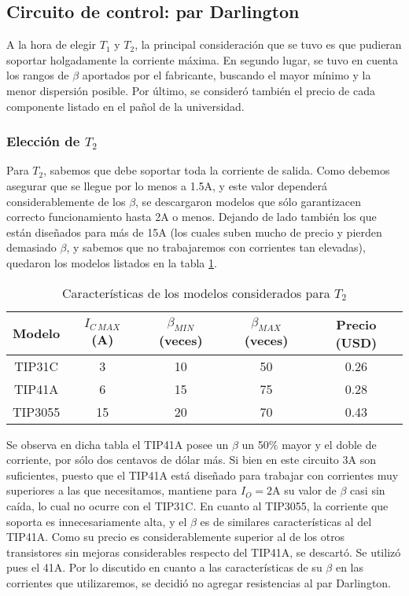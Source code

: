 \documentclass[e2_tp1_main.tex]{subfiles}
\begin{document}
\subsection{Circuito de control: par Darlington}

A la hora de elegir $T_1$ y $T_2$, la principal consideraci\'on que se tuvo es que pudieran soportar holgadamente la corriente m\'axima. En segundo lugar, se tuvo en cuenta los rangos de $\beta$ aportados por el fabricante, buscando el mayor m\'inimo y la menor dispersi\'on posible. Por \'ultimo, se consider\'o tambi\'en el precio de cada componente listado en el pa\~nol de la universidad.


\subsubsection{Elecci\'on de $T_2$}

Para $T_2$, sabemos que debe soportar toda la corriente de salida. Como debemos asegurar que se llegue por lo menos a 1.5A, y este valor depender\'a considerablemente de los $\beta$, se descargaron modelos que s\'olo garantizacen correcto funcionamiento hasta 2A o menos. Dejando de lado tambi\'en los que est\'an dise\~nados para m\'as de 15A (los cuales suben mucho de precio y pierden demasiado $\beta$, y sabemos que no trabajaremos con corrientes tan elevadas), quedaron los modelos listados en la tabla \ref{table:modelos-t2}.

\begin{table}[ht!]
	\centering
	\begin{tabular}{|c|c|c|c|c|}
		\hline 
		Modelo & $I_{C\, MAX}$ (A) & $\beta_{MIN}$ (veces) & $\beta_{MAX}$ (veces) & Precio (USD) \\ 
		\hline \hline
		TIP31C & 3 & 10 & 50 & 0.26 \\ 
		\hline 
		TIP41A & 6 & 15 & 75 & 0.28 \\ 
		\hline 
		TIP3055 & 15 & 20 & 70 & 0.43 \\ 
		\hline 
		\end{tabular} 	
	\caption{Caracter\'isticas de los modelos considerados para $T_2$}
	\label{table:modelos-t2}
\end{table}

Se observa en dicha tabla el TIP41A posee un $\beta$ un 50\% mayor y el doble de corriente, por s\'olo dos centavos de d\'olar m\'as. Si bien en este circuito 3A son suficientes, puesto que el TIP41A est\'a dise\~nado para trabajar con corrientes muy superiores a las que necesitamos, mantiene para $I_{O} = 2$A su valor de $\beta$ casi sin ca\'ida, lo cual no ocurre con el TIP31C. En cuanto al TIP3055, la corriente que soporta es innecesariamente alta, y el $\beta$ es de similares caracter\'isticas al del TIP41A. Como su precio es considerablemente superior al de los otros transistores sin mejoras considerables respecto del TIP41A, se descart\'o. Se utiliz\'o pues el 41A. Por lo discutido en cuanto a las caracter\'isticas de su $\beta$ en las corrientes que utilizaremos, se decidi\'o no agregar resistencias al par Darlington.
\end{document}

